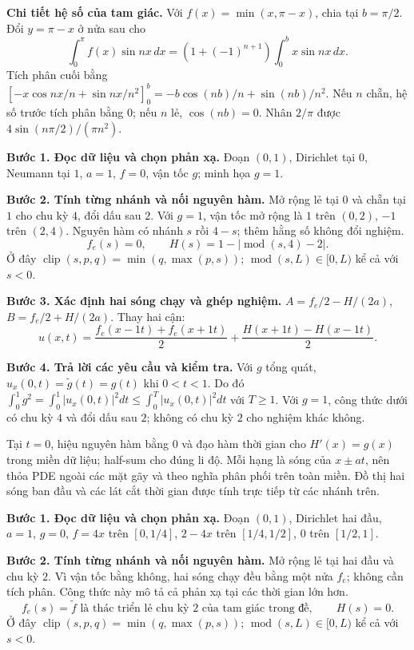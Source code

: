 \textbf{Chi tiết hệ số của tam giác.} Với $f(x)=\min(x,\pi-x)$, chia tại $b=\pi/2$. Đổi $y=\pi-x$ ở nửa sau cho
\[\int_0^\pi f(x)\sin nx\,dx=(1+(-1)^{n+1})\int_0^b x\sin nx\,dx.\]
Tích phân cuối bằng $[-x\cos nx/n+\sin nx/n^2]_0^b=-b\cos(nb)/n+\sin(nb)/n^2$. Nếu $n$ chẵn, hệ số trước tích phân bằng $0$; nếu $n$ lẻ, $\cos(nb)=0$. Nhân $2/\pi$ được $4\sin(n\pi/2)/(\pi n^2)$.

\textbf{Bước 1. Đọc dữ liệu và chọn phản xạ.} Đoạn $(0,1)$, Dirichlet tại $0$, Neumann tại $1$, $a=1$, $f=0$, vận tốc $g$; minh họa $g=1$.

\textbf{Bước 2. Tính từng nhánh và nối nguyên hàm.} Mở rộng lẻ tại $0$ và chẵn tại $1$ cho chu kỳ $4$, đổi dấu sau $2$. Với $g=1$, vận tốc mở rộng là $1$ trên $(0,2)$, $-1$ trên $(2,4)$. Nguyên hàm có nhánh $s$ rồi $4-s$; thêm hằng số không đổi nghiệm.
\[f_e(s)=0,\qquad H(s)=1-|\operatorname{mod}(s,4)-2|.\]
Ở đây $\operatorname{clip}(s,p,q)=\min(q,\max(p,s))$; $\operatorname{mod}(s,L)\in[0,L)$ kể cả với $s<0$.

\textbf{Bước 3. Xác định hai sóng chạy và ghép nghiệm.} $A=f_e/2-H/(2a)$, $B=f_e/2+H/(2a)$. Thay hai cận:
\[u(x,t)=\frac{f_e(x-1t)+f_e(x+1t)}2+\frac{H(x+1t)-H(x-1t)}{2}.\]

\textbf{Bước 4. Trả lời các yêu cầu và kiểm tra.} Với $g$ tổng quát, $u_x(0,t)=\widetilde g(t)=g(t)$ khi $0<t<1$. Do đó $\int_0^1g^2=\int_0^1|u_x(0,t)|^2dt\le\int_0^T|u_x(0,t)|^2dt$ với $T\ge1$. Với $g=1$, công thức dưới có chu kỳ $4$ và đổi dấu sau $2$; không có chu kỳ $2$ cho nghiệm khác không.

Tại $t=0$, hiệu nguyên hàm bằng $0$ và đạo hàm thời gian cho $H'(x)=g(x)$ trong miền dữ liệu; half-sum cho đúng li độ. Mỗi hạng là sóng của $x\pm at$, nên thỏa PDE ngoài các mặt gãy và theo nghĩa phân phối trên toàn miền. Đồ thị hai sóng ban đầu và các lát cắt thời gian được tính trực tiếp từ các nhánh trên.

\textbf{Bước 1. Đọc dữ liệu và chọn phản xạ.} Đoạn $(0,1)$, Dirichlet hai đầu, $a=1$, $g=0$, $f=4x$ trên $[0,1/4]$, $2-4x$ trên $[1/4,1/2]$, $0$ trên $[1/2,1]$.

\textbf{Bước 2. Tính từng nhánh và nối nguyên hàm.} Mở rộng lẻ tại hai đầu và chu kỳ $2$. Vì vận tốc bằng không, hai sóng chạy đều bằng một nửa $f_e$; không cần tích phân. Công thức này mô tả cả phản xạ tại các thời gian lớn hơn.
\[f_e(s)=\widetilde f\text{ là thác triển lẻ chu kỳ }2\text{ của tam giác trong đề},\qquad H(s)=0.\]
Ở đây $\operatorname{clip}(s,p,q)=\min(q,\max(p,s))$; $\operatorname{mod}(s,L)\in[0,L)$ kể cả với $s<0$.

